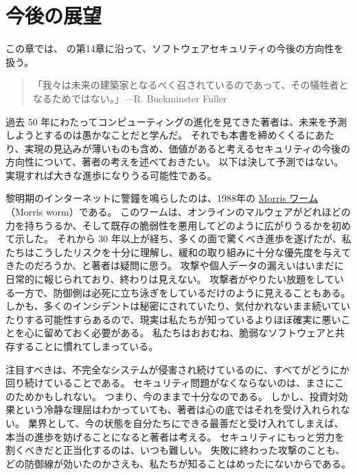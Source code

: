 \documentclass[uplatex]{jsarticle}
\begin{document}
\newpage

\section{今後の展望}

この章では、\cite{Kohnfelder2021} の第14章に沿って、ソフトウェアセキュリティの今後の方向性を扱う。

\begin{quote}
「我々は未来の建築家となるべく召されているのであって、その犠牲者となるためではない。」---R. Buckminster Fuller
\end{quote}

過去 50 年にわたってコンピューティングの進化を見てきた著者は、未来を予測しようとするのは愚かなことだと学んだ。
それでも本書を締めくくるにあたり、実現の見込みが薄いものも含め、価値があると考えるセキュリティの今後の方向性について、著者の考えを述べておきたい。
以下は決して予測ではない。実現すれば大きな進歩になりうる可能性である。

黎明期のインターネットに警鐘を鳴らしたのは、1988年の \underline{Morris ワーム}（Morris worm）である。
このワームは、オンラインのマルウェアがどれほどの力を持ちうるか、そして既存の脆弱性を悪用してどのように広がりうるかを初めて示した。
それから 30 年以上が経ち、多くの面で驚くべき進歩を遂げたが、私たちはこうしたリスクを十分に理解し、緩和の取り組みに十分な優先度を与えてきたのだろうか、と著者は疑問に思う。
攻撃や個人データの漏えいはいまだに日常的に報じられており、終わりは見えない。
攻撃者がやりたい放題をしている一方で、防御側は必死に立ち泳ぎをしているだけのように見えることもある。
しかも、多くのインシデントは秘密にされていたり、気付かれないまま続いていたりする可能性すらあるので、現実は私たちが知っているよりほぼ確実に悪いことを心に留めておく必要がある。
私たちはおおむね、脆弱なソフトウェアと共存することに慣れてしまっている。

注目すべきは、不完全なシステムが侵害され続けているのに、すべてがどうにか回り続けていることである。
セキュリティ問題がなくならないのは、まさにこのためかもしれない。
つまり、今のままで十分なのである。
しかし、投資対効果という冷静な理屈はわかっていても、著者は心の底ではそれを受け入れられない。
業界として、今の状態を自分たちにできる最善だと受け入れてしまえば、本当の進歩を妨げることになると著者は考える。
セキュリティにもっと労力を割くべきだと正当化するのは、いつも難しい。
失敗に終わった攻撃のことも、どの防御線が効いたのかさえも、私たちが知ることはめったにないからである。
\end{document}
